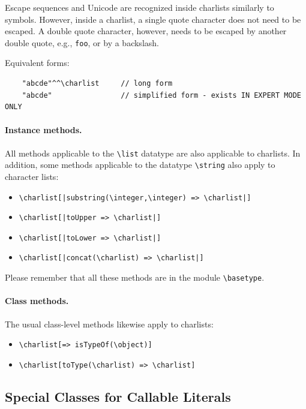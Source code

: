 \documentclass[11pt]{article}
\newcommand{\ERGO}{\mbox{\smaller{\ensuremath{\cal{E}}\smaller{{\sc{RGO}}}}}\xspace}
\newcommand{\FLSYSTEM}{\ERGO}
\newcommand{\bs}{\textbackslash}
\newcommand{\dq}{\symbol{34}}
\begin{document}
Escape sequences and Unicode are recognized inside \FLSYSTEM charlists
similarly to \FLSYSTEM symbols.  However, inside a charlist, a single quote
character does not need to be escaped. A double quote character, however,
needs to be escaped by another double quote, e.g.,
\texttt{{\dq}{\dq}{\dq}foo{\dq}{\dq}{\dq}}, or by a backslash.

\noindent
Equivalent forms:
\begin{verbatim}
    "abcde"^^\charlist     // long form
    "abcde"                // simplified form - exists IN EXPERT MODE ONLY
\end{verbatim}


\paragraph{Instance methods.}
All methods applicable to the \texttt{\bs{}list} datatype
are also applicable to charlists.
In addition, some methods applicable to the datatype \texttt{\bs{}string}
also apply to character lists:
\begin{itemize}
\item {\tt \bs{}charlist[|substring(\bs{}integer,\bs{}integer) => \bs{}charlist|]}  
\item {\tt \bs{}charlist[|toUpper => \bs{}charlist|]}  
\item {\tt \bs{}charlist[|toLower => \bs{}charlist|]}  
\item {\tt \bs{}charlist[|concat(\bs{}charlist) => \bs{}charlist|]}  
\end{itemize}

\noindent
Please remember that all these methods are in the module
\texttt{\bs{}basetype}. 

\paragraph{Class methods.}
The usual class-level methods likewise apply to charlists:
\begin{itemize}
\item {\tt \bs{}charlist[=> isTypeOf(\bs{}object)]}  
\item {\tt \bs{}charlist[toType(\bs{}charlist) => \bs{}charlist]}  
\end{itemize}

\subsection{Special Classes for Callable Literals}\label{sec-callable}
\end{document}
